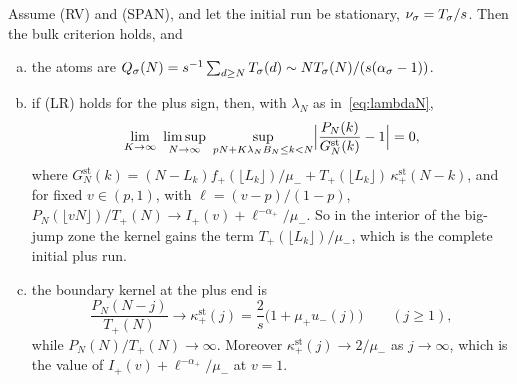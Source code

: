 \begin{corollary}\label{cor:stationary}
Assume (RV) and (SPAN), and let the initial run be stationary,
$\nu_\sigma=T_\sigma/s$. Then the bulk criterion holds, and
\begin{enumerate}[(a)]
\item the atoms are $Q_\sigma(N)=s^{-1}\sum_{d\ge N}T_\sigma(d)\sim NT_\sigma(N)/(s(\alpha_\sigma-1))$.
\item if (LR) holds for the plus sign, then, with $\lambda_N$ as in~\eqref{eq:lambdaN},
\[
 \lim_{K\to\infty}\ \limsup_{N\to\infty}\ \sup_{pN+K\lambda_NB_N\le k<N}
 \Bigl|\frac{P_N(k)}{G^{\mathrm{st}}_N(k)}-1\Bigr|=0,
\]
where
$G^{\mathrm{st}}_N(k)=(N-L_k)f_\plus(\lfloor L_k\rfloor)/\mu_\minus+T_\plus(\lfloor L_k\rfloor)\,\kappa^{\mathrm{st}}_\plus(N-k)$,
and for fixed $v\in(p,1)$, with $\ell=(v-p)/(1-p)$,
$P_N(\lfloor vN\rfloor)/T_\plus(N)\to I_\plus(v)+\ell^{-\alpha_\plus}/\mu_\minus$. So in the
interior of the big-jump zone the kernel gains the term $T_\plus(\lfloor L_k\rfloor)/\mu_\minus$,
which is the complete initial plus run.
\item the boundary kernel at the plus end is
\[
 \frac{P_N(N-j)}{T_\plus(N)}\to\kappa^{\mathrm{st}}_\plus(j)=\frac{2}{s}\bigl(1+\mu_\plus u_\minus(j)\bigr)\qquad(j\ge1),
\]
while $P_N(N)/T_\plus(N)\to\infty$. Moreover $\kappa^{\mathrm{st}}_\plus(j)\to2/\mu_\minus$ as
$j\to\infty$, which is the value of $I_\plus(v)+\ell^{-\alpha_\plus}/\mu_\minus$ at $v=1$.
\end{enumerate}
\end{corollary}

